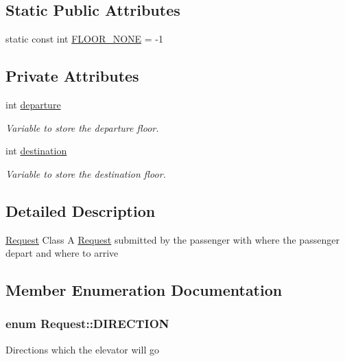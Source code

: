 \subsection*{Static Public Attributes}
\begin{DoxyCompactItemize}
\item 
static const int \hyperlink{class_request_a9bf9e694beed6b73dd9eaf3f3a73708b}{FLOOR\_\-NONE} = -\/1
\end{DoxyCompactItemize}
\subsection*{Private Attributes}
\begin{DoxyCompactItemize}
\item 
\hypertarget{class_request_a485c04f740b2b104773e7a562490daa9}{
int \hyperlink{class_request_a485c04f740b2b104773e7a562490daa9}{departure}}
\label{class_request_a485c04f740b2b104773e7a562490daa9}

\begin{DoxyCompactList}\small\item\em Variable to store the departure floor. \end{DoxyCompactList}\item 
\hypertarget{class_request_a4f515d80c8c978b213af816b54598497}{
int \hyperlink{class_request_a4f515d80c8c978b213af816b54598497}{destination}}
\label{class_request_a4f515d80c8c978b213af816b54598497}

\begin{DoxyCompactList}\small\item\em Variable to store the destination floor. \end{DoxyCompactList}\end{DoxyCompactItemize}


\subsection{Detailed Description}
\hyperlink{class_request}{Request} Class A \hyperlink{class_request}{Request} submitted by the passenger with where the passenger depart and where to arrive 

\subsection{Member Enumeration Documentation}
\hypertarget{class_request_a31872cb7919df688dc6866ea607b9d9d}{
\subsubsection[{DIRECTION}]{\setlength{\rightskip}{0pt plus 5cm}enum {\bf Request::DIRECTION}}}
\label{class_request_a31872cb7919df688dc6866ea607b9d9d}
Directions which the elevator will go 

